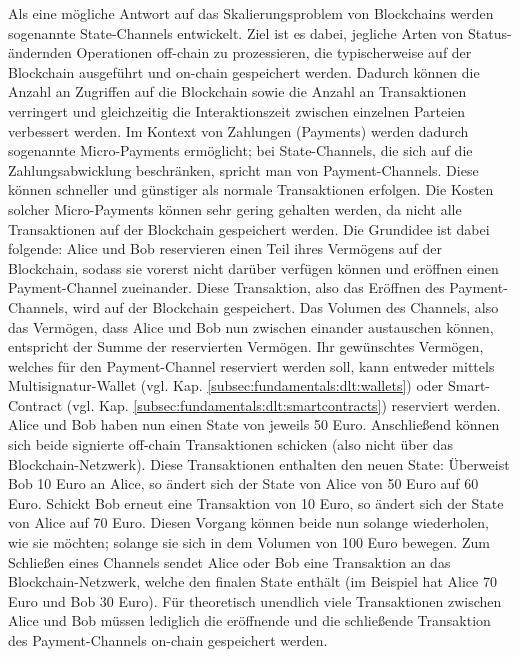 Als eine mögliche Antwort auf das Skalierungsproblem von Blockchains werden sogenannte State-Channels \cite{Coleman2018} entwickelt. Ziel ist es dabei, jegliche Arten von Status-ändernden Operationen off-chain zu prozessieren, die typischerweise auf der Blockchain ausgeführt und on-chain gespeichert werden. Dadurch können die Anzahl an Zugriffen auf die Blockchain sowie die Anzahl an Transaktionen verringert und gleichzeitig die Interaktionszeit zwischen einzelnen Parteien verbessert werden. Im Kontext von Zahlungen (Payments) werden dadurch sogenannte Micro-Payments ermöglicht; bei State-Channels, die sich auf die Zahlungsabwicklung beschränken, spricht man von Payment-Channels. Diese können schneller und günstiger als normale Transaktionen erfolgen. Die Kosten solcher Micro-Payments können sehr gering gehalten werden, da nicht alle Transaktionen auf der Blockchain gespeichert werden. Die Grundidee ist dabei folgende: Alice und Bob reservieren einen Teil ihres Vermögens auf der Blockchain, sodass sie vorerst nicht darüber verfügen können und eröffnen einen Payment-Channel zueinander. Diese Transaktion, also das Eröffnen des Payment-Channels, wird auf der Blockchain gespeichert. Das Volumen des Channels, also das Vermögen, dass Alice und Bob nun zwischen einander austauschen können, entspricht der Summe der reservierten Vermögen. Ihr gewünschtes Vermögen, welches für den Payment-Channel reserviert werden soll, kann entweder mittels Multisignatur-Wallet (vgl. Kap. \ref{subsec:fundamentals:dlt:wallets}) oder Smart-Contract (vgl. Kap. \ref{subsec:fundamentals:dlt:smartcontracts}) reserviert werden. Alice und Bob haben nun einen State von jeweils 50 Euro. Anschließend können sich beide signierte off-chain Transaktionen schicken (also nicht über das Blockchain-Netzwerk). Diese Transaktionen enthalten den neuen State: Überweist Bob 10 Euro an Alice, so ändert sich der State von Alice von 50 Euro auf 60 Euro. Schickt Bob erneut eine Transaktion von 10 Euro, so ändert sich der State von Alice auf 70 Euro. Diesen Vorgang können beide nun solange wiederholen, wie sie möchten; solange sie sich in dem Volumen von 100 Euro bewegen. Zum Schließen eines Channels sendet Alice oder Bob eine Transaktion an das Blockchain-Netzwerk, welche den finalen State enthält (im Beispiel hat Alice 70 Euro und Bob 30 Euro). Für theoretisch unendlich viele Transaktionen zwischen Alice und Bob müssen lediglich die eröffnende und die schließende Transaktion des Payment-Channels on-chain gespeichert werden.\\
